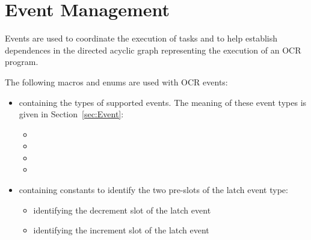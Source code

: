 \section{Event Management}
\label{sec:OCREventManagement}

Events are used to coordinate the execution of tasks and to
help establish dependences in the directed acyclic graph representing the
execution of an OCR program.

The following macros and enums are used with OCR events:
\begin{itemize}
\item \hypertarget{type_ocrEventTypes_t}{} containing the types of supported events. The
meaning of these event types is given in Section~\ref{sec:Event}:
  \begin{itemize}
    \item {}
    \item {}
    \item {}
    \item {}
  \end{itemize}
\item \hypertarget{type_ocrLatchEventSlots}{} containing constants to
identify the two pre-slots of the latch event type:
  \begin{itemize}
    \item {} identifying the decrement slot of
      the latch event
    \item {} identifying the increment slot of
      the latch event
  \end{itemize}
\end{itemize}

